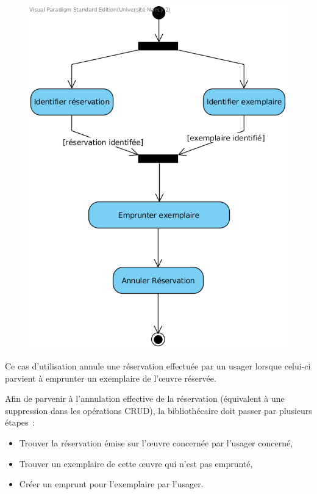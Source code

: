 \documentclass[a4paper,12pt]{article}
\begin{document}
\begin{figure}

\label{wrap-fig:emprunt-reserve}
\includegraphics[width=\linewidth]{./res/img/emprunter-exemplaire-d-une-oeuvre-reservee.png}
\end{figure}


Ce cas d’utilisation annule une réservation effectuée par un usager lorsque
celui-ci parvient à emprunter un exemplaire de l’œuvre réservée.

Afin de parvenir à l’annulation effective de la réservation (équivalent à une suppression dans les opérations CRUD), la bibliothécaire doit passer par plusieurs étapes :

\begin{itemize}
\item Trouver la réservation émise sur l’œuvre concernée par l’usager concerné,
\item Trouver un exemplaire de cette œuvre qui n’est pas emprunté,
\item Créer un emprunt pour l’exemplaire par l’usager.
\end{itemize}
\end{document}

